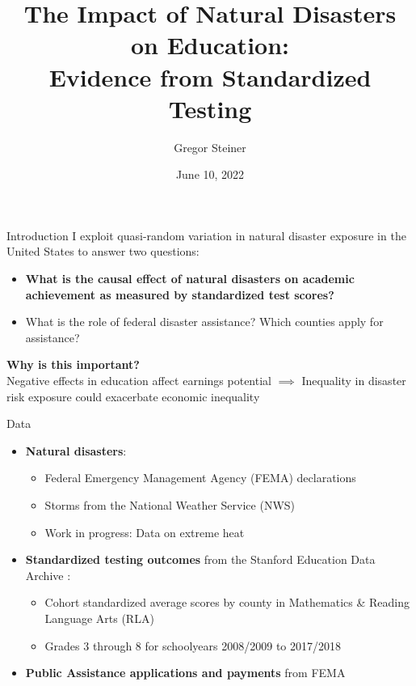 \documentclass[hyperref={colorlinks = true,linkcolor = blue, citecolor=blue,urlcolor=blue}]{beamer}
\title{The Impact of Natural Disasters on Education: \\ Evidence from Standardized Testing}
\author{Gregor Steiner}
\date{June 10, 2022}
\begin{document}
		
\begin{frame}[plain]
    \maketitle
\end{frame}

\begin{frame}{Introduction}
	I exploit quasi-random variation in natural disaster exposure in the United States to answer two questions:
	\begin{itemize}
		\item \textbf{What is the causal effect of natural disasters on academic achievement as measured by standardized test scores?}
		\item What is the role of federal disaster assistance? Which counties apply for assistance?
	\end{itemize}
	\textbf{Why is this important?}\\
	Negative effects in education affect earnings
	potential $\implies$ Inequality in disaster risk exposure could exacerbate economic inequality
\end{frame}

\begin{frame}{Data}
	\begin{itemize}
		\item \textbf{Natural disasters}:
		\begin{itemize}
			\item Federal Emergency Management Agency (FEMA) declarations 
			\item Storms from the National Weather Service (NWS)
			\item Work in progress: Data on extreme heat
		\end{itemize}
		\item \textbf{Standardized testing outcomes} from the Stanford Education Data Archive \citep{SEDA}:
		\begin{itemize}
			\item Cohort standardized average scores by county in Mathematics \& Reading Language Arts (RLA)
			\item Grades 3 through 8 for schoolyears 2008/2009 to 2017/2018
		\end{itemize}
		\item \textbf{Public Assistance applications and payments} from FEMA
	\end{itemize}
\end{frame}
\end{document}
